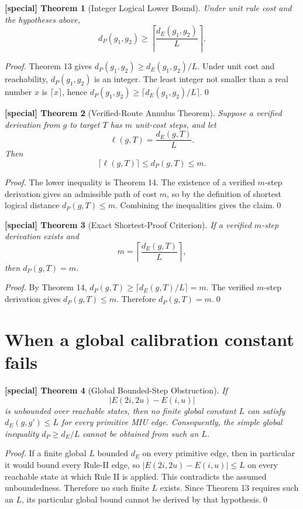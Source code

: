 \documentclass[11pt]{article}
\newtheorem{spthm}{[special] Theorem}
\newcommand{\dE}{d_E}
\newcommand{\dP}{d_P}
\begin{document}
\begin{spthm}[Integer Logical Lower Bound]
Under unit rule cost and the hypotheses above,
\[
\dP(g_1,g_2)\ge\left\lceil\frac{\dE(g_1,g_2)}{L}\right\rceil.
\]
\end{spthm}
\textit{Proof.} Theorem 13 gives $d_P(g_1,g_2)\ge \dE(g_1,g_2)/L$. Under unit cost and reachability, $d_P(g_1,g_2)$ is an integer. The least integer not smaller than a real number $x$ is $\lceil x\rceil$, hence $d_P(g_1,g_2)\ge\lceil\dE(g_1,g_2)/L\rceil$.\qed


\begin{spthm}[Verified-Route Annulus Theorem]
Suppose a verified derivation from $g$ to target $T$ has $m$ unit-cost steps, and let
\[
\ell(g,T)=\frac{\dE(g,T)}{L}.
\]
Then
\[
\lceil\ell(g,T)\rceil\le\dP(g,T)\le m.
\]
\end{spthm}
\textit{Proof.} The lower inequality is Theorem 14. The existence of a verified $m$-step derivation gives an admissible path of cost $m$, so by the definition of shortest logical distance $d_P(g,T)\le m$. Combining the inequalities gives the claim.\qed


\begin{spthm}[Exact Shortest-Proof Criterion]
If a verified $m$-step derivation exists and
\[
m=\left\lceil\frac{\dE(g,T)}{L}\right\rceil,
\]
then $\dP(g,T)=m$.
\end{spthm}
\textit{Proof.} By Theorem 14, $d_P(g,T)\ge\lceil\dE(g,T)/L\rceil=m$. The verified $m$-step derivation gives $d_P(g,T)\le m$. Therefore $d_P(g,T)=m$.\qed


\section{When a global calibration constant fails}
\begin{spthm}[Global Bounded-Step Obstruction]
If
\[
|E(2i,2u)-E(i,u)|
\]
is unbounded over reachable states, then no finite global constant $L$ can satisfy $\dE(g,g')\le L$ for every primitive MIU edge. Consequently, the simple global inequality $\dP\ge \dE/L$ cannot be obtained from such an $L$.
\end{spthm}
\textit{Proof.} If a finite global $L$ bounded $\dE$ on every primitive edge, then in particular it would bound every Rule-II edge, so $|E(2i,2u)-E(i,u)|\le L$ on every reachable state at which Rule II is applied. This contradicts the assumed unboundedness. Therefore no such finite $L$ exists. Since Theorem 13 requires such an $L$, its particular global bound cannot be derived by that hypothesis.\qed
\end{document}
